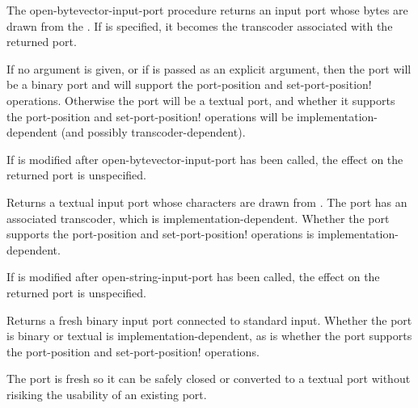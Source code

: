 \begin{entry}{%
}

   
The {\cf open-bytevector-input-port} procedure returns an input port whose bytes are drawn from the
.
If  is specified, it becomes the transcoder associated
with the returned port.

If no  argument is given, or
if \schfalse{} is passed as an explicit argument,
then the port will be a binary port and will support the
{\cf port-position} and {\cf set-port-position!}  operations.
Otherwise the port will be a textual port, and whether it supports
the {\cf port-position} and {\cf set-port-position!} operations
will be implementation-dependent (and possibly transcoder-dependent).

If  is modified after {\cf open-\linebreak[0]bytevector-\linebreak[0]input-\linebreak[0]port}
has been called, the effect on the returned
port is unspecified.
\end{entry}

\begin{entry}{%
}

Returns a textual input port whose characters are drawn from
.  The port has an associated transcoder, which is implementation-dependent.
Whether the port supports
the {\cf port-position} and {\cf set-port-position!} operations
is implementation-dependent.

If  is modified after {\cf open-string-input-port}
has been called, the effect on the returned port is unspecified.
\end{entry}

\begin{entry}{%
}
   
Returns a fresh binary input port connected to standard input.
Whether the port is binary or textual is implementation-dependent,
as is whether the port supports
the {\cf port-position} and {\cf set-port-position!} operations.

\begin{rationale}
  The port is fresh so it can be safely closed or converted to a
  textual port without risiking the usability of an existing port.
\end{rationale}
\end{entry}

